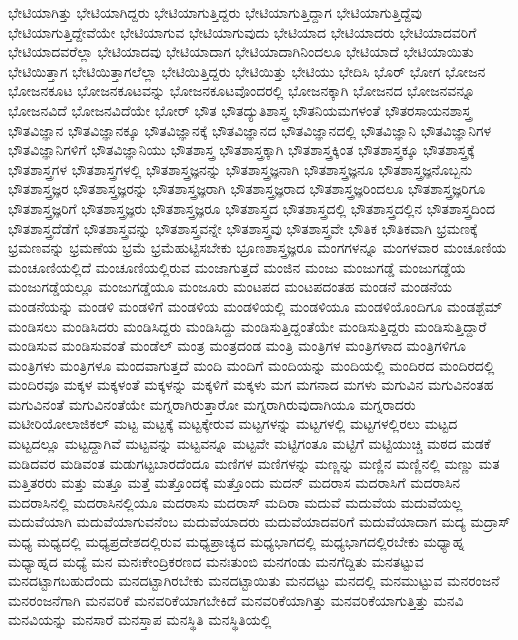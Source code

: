 {ಭೇಟಿಯಾಗಿತ್ತು
ಭೇಟಿಯಾಗಿದ್ದರು
ಭೇಟಿಯಾಗುತ್ತಿದ್ದರು
ಭೇಟಿಯಾಗುತ್ತಿದ್ದಾಗ
ಭೇಟಿಯಾಗುತ್ತಿದ್ದೆವು
ಭೇಟಿಯಾಗುತ್ತಿದ್ದೇವೆಯೇ
ಭೇಟಿಯಾಗುವ
ಭೇಟಿಯಾಗುವುದು
ಭೇಟಿಯಾದ
ಭೇಟಿಯಾದರು
ಭೇಟಿಯಾದವರಿಗೆ
ಭೇಟಿಯಾದವರೆಲ್ಲಾ
ಭೇಟಿಯಾದವು
ಭೇಟಿಯಾದಾಗ
ಭೇಟಿಯಾದಾಗಿನಿಂದಲೂ
ಭೇಟಿಯಾದೆ
ಭೇಟಿಯಾಯಿತು
ಭೇಟಿಯಿತ್ತಾಗ
ಭೇಟಿಯಿತ್ತಾಗಲೆಲ್ಲಾ
ಭೇಟಿಯಿತ್ತಿದ್ದರು
ಭೇಟಿಯಿತ್ತು
ಭೇಟಿಯು
ಭೇದಿಸಿ
ಭೊರ್
ಭೋಗ
ಭೋಜನ
ಭೋಜನಕೂಟ
ಭೋಜನಕೂಟವನ್ನು
ಭೋಜನಕೂಟವೊಂದರಲ್ಲಿ
ಭೋಜನಕ್ಕಾಗಿ
ಭೋಜನದ
ಭೋಜನವನ್ನೂ
ಭೋಜನವಿದೆ
ಭೋಜನವಿದೆಯೇ
ಭೋರ್
ಭೌತ
ಭೌತದ್ಯುತಿಶಾಸ್ತ್ರ
ಭೌತನಿಯಮಗಳಂತೆ
ಭೌತರಸಾಯನಶಾಸ್ತ್ರ
ಭೌತವಿಜ್ಞಾನ
ಭೌತವಿಜ್ಞಾನಕ್ಕೂ
ಭೌತವಿಜ್ಞಾನಕ್ಕೆ
ಭೌತವಿಜ್ಞಾನದ
ಭೌತವಿಜ್ಞಾನದಲ್ಲಿ
ಭೌತವಿಜ್ಞಾನಿ
ಭೌತವಿಜ್ಞಾನಿಗಳ
ಭೌತವಿಜ್ಞಾನಿಗಳಿಗೆ
ಭೌತವಿಜ್ಞಾನಿಯು
ಭೌತಶಾಸ್ತ್ರ
ಭೌತಶಾಸ್ತ್ರಕ್ಕಾಗಿ
ಭೌತಶಾಸ್ತ್ರಕ್ಕಿಂತ
ಭೌತಶಾಸ್ತ್ರಕ್ಕೂ
ಭೌತಶಾಸ್ತ್ರಕ್ಕೆ
ಭೌತಶಾಸ್ತ್ರಗಳ
ಭೌತಶಾಸ್ತ್ರಗಳಲ್ಲಿ
ಭೌತಶಾಸ್ತ್ರಜ್ಞನನ್ನು
ಭೌತಶಾಸ್ತ್ರಜ್ಞನಾಗಿ
ಭೌತಶಾಸ್ತ್ರಜ್ಞನೂ
ಭೌತಶಾಸ್ತ್ರಜ್ಞನೊಬ್ಬನು
ಭೌತಶಾಸ್ತ್ರಜ್ಞರ
ಭೌತಶಾಸ್ತ್ರಜ್ಞರನ್ನು
ಭೌತಶಾಸ್ತ್ರಜ್ಞರಾಗಿ
ಭೌತಶಾಸ್ತ್ರಜ್ಞರಾದ
ಭೌತಶಾಸ್ತ್ರಜ್ಞರಿಂದಲೂ
ಭೌತಶಾಸ್ತ್ರಜ್ಞರಿಗೂ
ಭೌತಶಾಸ್ತ್ರಜ್ಞರಿಗೆ
ಭೌತಶಾಸ್ತ್ರಜ್ಞರು
ಭೌತಶಾಸ್ತ್ರಜ್ಞರೂ
ಭೌತಶಾಸ್ತ್ರದ
ಭೌತಶಾಸ್ತ್ರದಲ್ಲಿ
ಭೌತಶಾಸ್ತ್ರದಲ್ಲಿನ
ಭೌತಶಾಸ್ತ್ರದಿಂದ
ಭೌತಶಾಸ್ತ್ರದೆಡೆಗೆ
ಭೌತಶಾಸ್ತ್ರವನ್ನು
ಭೌತಶಾಸ್ತ್ರವನ್ನೇ
ಭೌತಶಾಸ್ತ್ರವು
ಭೌತಶಾಸ್ತ್ರವೇ
ಭೌತಿಕ
ಭೌತಿಕವಾಗಿ
ಭ್ರಮಣಕ್ಕೆ
ಭ್ರಮಣವನ್ನು
ಭ್ರಮಣೆಯ
ಭ್ರಮೆ
ಭ್ರಮೆಹುಟ್ಟಿಸಬೇಕು
ಭ್ರೂಣಶಾಸ್ತ್ರಜ್ಞರೂ
ಮಂಗಗಳನ್ನೂ
ಮಂಗಳವಾರ
ಮಂಚೂಣಿಯ
ಮಂಚೂಣಿಯಲ್ಲಿದೆ
ಮಂಚೂಣಿಯಲ್ಲಿರುವ
ಮಂಜಾಗುತ್ತದೆ
ಮಂಜಿನ
ಮಂಜು
ಮಂಜುಗಡ್ಡೆ
ಮಂಜುಗಡ್ಡೆಯ
ಮಂಜುಗಡ್ಡೆಯಲ್ಲೂ
ಮಂಜುಗಡ್ಡೆಯೂ
ಮಂಜೂರು
ಮಂಟಪದ
ಮಂಟಪದಂತಹ
ಮಂಡನೆ
ಮಂಡನೆಯ
ಮಂಡನೆಯನ್ನು
ಮಂಡಳಿ
ಮಂಡಳಿಗೆ
ಮಂಡಳಿಯ
ಮಂಡಳಿಯಲ್ಲಿ
ಮಂಡಳಿಯೂ
ಮಂಡಳಿಯೊಂದಿಗೂ
ಮಂಡಶ್ಬೆಮ್
ಮಂಡಿಸಲು
ಮಂಡಿಸಿದರು
ಮಂಡಿಸಿದ್ದರು
ಮಂಡಿಸಿದ್ದು
ಮಂಡಿಸುತ್ತಿದ್ದಂತೆಯೇ
ಮಂಡಿಸುತ್ತಿದ್ದರು
ಮಂಡಿಸುತ್ತಿದ್ದಾರೆ
ಮಂಡಿಸುವ
ಮಂಡಿಸುವಂತೆ
ಮಂಡೆಲ್
ಮಂತ್ರ
ಮಂತ್ರದಂಡ
ಮಂತ್ರಿ
ಮಂತ್ರಿಗಳ
ಮಂತ್ರಿಗಳಾದ
ಮಂತ್ರಿಗಳಿಗೂ
ಮಂತ್ರಿಗಳು
ಮಂತ್ರಿಗಳೂ
ಮಂದವಾಗುತ್ತದೆ
ಮಂದಿ
ಮಂದಿಗೆ
ಮಂದಿಯನ್ನು
ಮಂದಿಯಲ್ಲಿ
ಮಂದಿರದ
ಮಂದಿರದಲ್ಲಿ
ಮಂದಿರವೂ
ಮಕ್ಕಳ
ಮಕ್ಕಳಂತೆ
ಮಕ್ಕಳನ್ನು
ಮಕ್ಕಳಿಗೆ
ಮಕ್ಕಳು
ಮಗ
ಮಗನಾದ
ಮಗಳು
ಮಗುವಿನ
ಮಗುವಿನಂತಹ
ಮಗುವಿನಂತೆ
ಮಗುವಿನಂತೆಯೇ
ಮಗ್ನರಾಗಿರುತ್ತಾರೋ
ಮಗ್ನರಾಗಿರುವುದಾಗಿಯೂ
ಮಗ್ನರಾದರು
ಮಟೀರಿಯೋಲಾಜಿಕಲ್
ಮಟ್ಟ
ಮಟ್ಟಕ್ಕೆ
ಮಟ್ಟಕ್ಕೇರುವ
ಮಟ್ಟಗಳನ್ನು
ಮಟ್ಟಗಳಲ್ಲಿ
ಮಟ್ಟಗಳಲ್ಲಿರಲು
ಮಟ್ಟದ
ಮಟ್ಟದಲ್ಲೂ
ಮಟ್ಟದ್ದಾಗಿವೆ
ಮಟ್ಟವನ್ನು
ಮಟ್ಟವನ್ನೂ
ಮಟ್ಟವೇ
ಮಟ್ಟಿಗಂತೂ
ಮಟ್ಟಿಗೆ
ಮಟ್ಟಿಯುಚ್ಚಿ
ಮಠದ
ಮಡಕೆ
ಮಡಿದವರ
ಮಡಿವಂತ
ಮಡುಗಟ್ಟಬಾರದೆಂದೂ
ಮಣಿಗಳ
ಮಣಿಗಳನ್ನು
ಮಣ್ಣನ್ನು
ಮಣ್ಣಿನ
ಮಣ್ಣಿನಲ್ಲಿ
ಮಣ್ಣು
ಮತ
ಮತ್ತಿತರರು
ಮತ್ತು
ಮತ್ತೂ
ಮತ್ತೆ
ಮತ್ತೊಂದಕ್ಕೆ
ಮತ್ತೊಂದು
ಮದನ್
ಮದರಾಸ
ಮದರಾಸಿಗೆ
ಮದರಾಸಿನ
ಮದರಾಸಿನಲ್ಲಿ
ಮದರಾಸಿನಲ್ಲಿಯೂ
ಮದರಾಸು
ಮದರಾಸ್
ಮದಿರಾ
ಮದುವೆ
ಮದುವೆಯ
ಮದುವೆಯಲ್ಲ
ಮದುವೆಯಾಗಿ
ಮದುವೆಯಾಗುವನೆಂಬ
ಮದುವೆಯಾದರು
ಮದುವೆಯಾದವರಿಗೆ
ಮದುವೆಯಾದಾಗ
ಮದ್ಯ
ಮದ್ರಾಸ್
ಮಧ್ಯ
ಮಧ್ಯದಲ್ಲಿ
ಮಧ್ಯಪ್ರದೇಶದಲ್ಲಿರುವ
ಮಧ್ಯಪ್ರಾಚ್ಯದ
ಮಧ್ಯಭಾಗದಲ್ಲಿ
ಮಧ್ಯಭಾಗದಲ್ಲಿರಬೇಕು
ಮಧ್ಯಾಹ್ನ
ಮಧ್ಯಾಹ್ನದ
ಮಧ್ಯೆ
ಮನ
ಮನಃಕೇಂದ್ರಿಕರಣದ
ಮನಃತುಂಬಿ
ಮನಗಂಡು
ಮನಗೆದ್ದಿತು
ಮನತಟ್ಟುವ
ಮನದಟ್ಟಾಗಬಹುದೆಂದು
ಮನದಟ್ಟಾಗಿರಬೇಕು
ಮನದಟ್ಟಾಯಿತು
ಮನದಟ್ಟು
ಮನದಲ್ಲಿ
ಮನಮುಟ್ಟುವ
ಮನರಂಜನೆ
ಮನರಂಜನೆಗಾಗಿ
ಮನವರಿಕೆ
ಮನವರಿಕೆಯಾಗಬೇಕಿದೆ
ಮನವರಿಕೆಯಾಗಿತ್ತು
ಮನವರಿಕೆಯಾಗುತ್ತಿತ್ತು
ಮನವಿ
ಮನವಿಯನ್ನು
ಮನಸಾರೆ
ಮನಸ್ತಾಪ
ಮನಸ್ಥಿತಿ
ಮನಸ್ಥಿತಿಯಲ್ಲಿ
}
